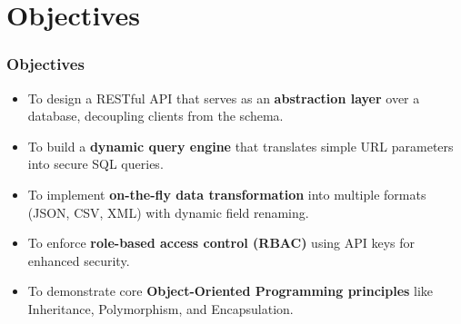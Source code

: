\documentclass{beamer}
\begin{document}
\section{Objectives}
\begin{frame}
    \frametitle{Objectives}
    \begin{itemize}
        \item To design a RESTful API that serves as an \textbf{abstraction layer} over a database, decoupling clients from the schema.
        \pause
        \item To build a \textbf{dynamic query engine} that translates simple URL parameters into secure SQL queries.
        \pause
        \item To implement \textbf{on-the-fly data transformation} into multiple formats (JSON, CSV, XML) with dynamic field renaming.
        \pause
        \item To enforce \textbf{role-based access control (RBAC)} using API keys for enhanced security.
        \pause
        \item To demonstrate core \textbf{Object-Oriented Programming principles} like Inheritance, Polymorphism, and Encapsulation.
    \end{itemize}
\end{frame}

\end{document}
